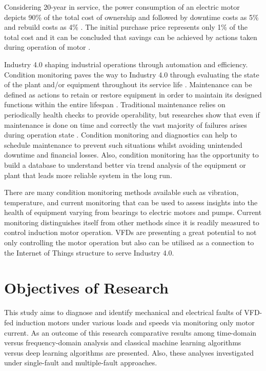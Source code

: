 Considering 20-year in service, the power consumption of an electric motor depicts 90\% of the total cost of ownership and followed by downtime costs as 5\% and rebuild costs as 4\% \cite{waide2011energy}. The initial purchase price represents only 1\% of the total cost and it can be concluded that savings can be achieved by actions taken during operation of motor \cite{waide2011energy}.

Industry 4.0 shaping industrial operations through automation and efficiency. Condition monitoring paves the way to Industry 4.0 through evaluating the state of the plant and/or equipment throughout its service life \cite{en201713306}. Maintenance can be defined as actions to retain or restore equipment in order to maintain its designed functions within the entire lifespan \cite{en201713306}. Traditional maintenance relies on periodically health checks to provide operability, but researches show that even if maintenance is done on time and correctly the vast majority of failures arises during operation state \cite{motor1985report}. Condition monitoring and diagnostics can help to schedule maintenance to prevent such situations whilst avoiding unintended downtime and financial losses. Also, condition monitoring has the opportunity to build a database to understand better via trend analysis of the equipment or plant that leads more reliable system in the long run. 

There are many condition monitoring methods available such as vibration, temperature, and current monitoring that can be used to assess insights into the health of equipment varying from bearings to electric motors and pumps. Current monitoring distinguishes itself from other methods since it is readily measured to control induction motor operation. VFDs are presenting a great potential to not only controlling the motor operation but also can be utilised as a connection to the Internet of Things structure to serve Industry 4.0.

\section{Objectives of Research}
\label{objectives}

This study aims to diagnose and identify mechanical and electrical faults of VFD-fed induction motors under various loads and speeds via monitoring only motor current. As an outcome of this research comparative results among time-domain versus frequency-domain analysis and classical machine learning algorithms versus deep learning algorithms are presented. Also, these analyses investigated under single-fault and multiple-fault approaches.

